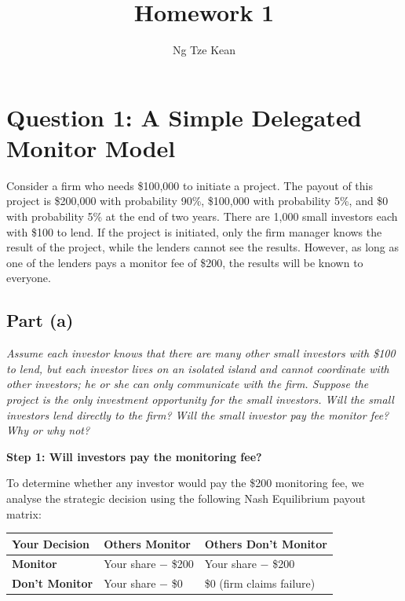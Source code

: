 \documentclass[a4paper]{article}
\title{Homework 1}
\author{Ng Tze Kean}
\begin{document}
\maketitle

\section{Question 1: A Simple Delegated Monitor Model}

Consider a firm who needs \$100,000 to initiate a project. The payout of
this project is \$200,000 with probability 90\%, \$100,000 with probability
5\%, and \$0 with probability 5\% at the end of two years. There are 1,000
small investors each with \$100 to lend. If the project is initiated, only
the firm manager knows the result of the project, while the lenders cannot
see the results. However, as long as one of the lenders pays a monitor fee
of \$200, the results will be known to everyone.

\subsection{Part (a)}

\textit{Assume each investor knows that there are many other small investors
with \$100 to lend, but each investor lives on an isolated island and cannot
coordinate with other investors; he or she can only communicate with the
firm. Suppose the project is the only investment opportunity for the small
investors. Will the small investors lend directly to the firm? Will the
small investor pay the monitor fee? Why or why not?}

\medskip
\textbf{Step 1: Will investors pay the monitoring fee?}

To determine whether any investor would pay the \$200 monitoring fee, we
analyse the strategic decision using the following Nash Equilibrium payout
matrix:

\begin{center}
\begin{tabular}{lll}
\toprule
\textbf{Your Decision} & \textbf{Others Monitor} & \textbf{Others Don't Monitor} \\
\midrule
\textbf{Monitor}      & Your share $-$ \$200  & Your share $-$ \$200 \\
\textbf{Don't Monitor} & Your share $-$ \$0   & \$0 (firm claims failure) \\
\bottomrule
\end{tabular}
\end{center}
\end{document}
